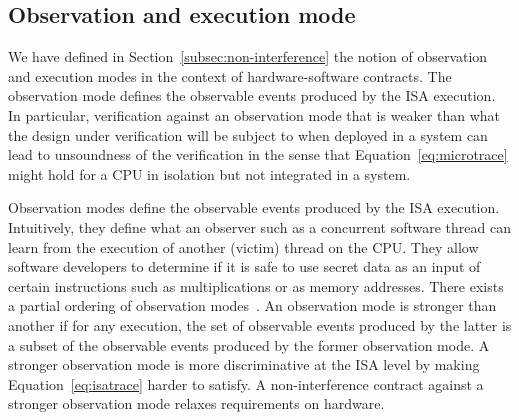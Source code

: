 
\subsection{Observation and execution mode}
\label{subsec:observation_mode}

We have defined in Section~\ref{subsec:non-interference} the notion of observation and execution modes in the context of hardware-software contracts.
The observation mode defines the observable events produced by the ISA execution.
In particular, verification against an observation mode that is weaker than what the design under verification will be subject to when deployed in a system can lead to unsoundness of the verification in the sense that Equation~\ref{eq:microtrace} might hold for a CPU in isolation but not integrated in a system.

Observation modes define the observable events produced by the ISA execution.
Intuitively, they define what an observer such as a concurrent software thread can learn from the execution of another (victim) thread on the CPU.
They allow software developers to determine if it is safe to use secret data as an input of certain instructions such as multiplications or as memory addresses.
There exists a partial ordering of observation modes~\cite{guarnieri2021hardware}.
An observation mode is stronger than another if for any execution, the set of observable events produced by the latter is a subset of the observable events produced by the former observation mode. 
A stronger observation mode is more discriminative at the ISA level by making Equation~\ref{eq:isatrace} harder to satisfy.
A non-interference contract against a stronger observation mode relaxes requirements on hardware.

